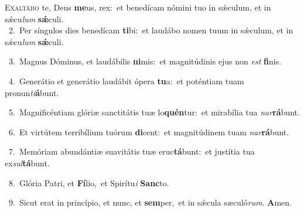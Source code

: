 \lettrine{\initial\textcolor{\initialcolor}{E}}{xaltábo} te, Deus \textbf{me}\-us, rex:~\star et benedícam nómini tuo in sǽculum, et in sǽcu\textit{lum} \textbf{sǽ}\-culi.\\
{\numbfont\textcolor{\numbcolor}{~2.}}~Per síngulos dies benedícam \textbf{ti}\-bi:~\star et laudábo nomen tuum in sǽculum, et in sǽcu\textit{lum} \textbf{sǽ}\-culi.\par
{\numbfont\textcolor{\numbcolor}{~3.}}~Magnus Dóminus, et laudábilis \textbf{ni}\-mis:~\star et magnitúdinis ejus non \textit{est} \textbf{fi}\-nis.\par
{\numbfont\textcolor{\numbcolor}{~4.}}~Generátio et generátio laudábit ópera \textbf{tu}\-a:~\star et poténtiam tuam pronun\-\textit{ti}\-\textbf{á}bunt.\par
{\numbfont\textcolor{\numbcolor}{~5.}}~Magnificéntiam glóriæ sanctitátis tuæ lo\-\textbf{quén}\-tur:~\star et mirabília tua \textit{nar}\-\textbf{rá}bunt.\par
{\numbfont\textcolor{\numbcolor}{~6.}}~Et virtútem terribílium tuórum \textbf{di}\-cent:~\star et magnitúdinem tuam \textit{nar}\-\textbf{rá}bunt.\par
{\numbfont\textcolor{\numbcolor}{~7.}}~Memóriam abundántiæ suavitátis tuæ eruc\-\textbf{tá}\-bunt:~\star et justítia tua ex\-\textit{sul}\-\textbf{tá}bunt.\par
{\numbfont\textcolor{\numbcolor}{~8.}}~Glória Patri, et \textbf{Fí}\-lio,~\star et Spirítu\textit{i} \textbf{Sanc}\-to.\par
{\numbfont\textcolor{\numbcolor}{~9.}}~Sicut erat in princípio, et nunc, et \textbf{sem}\-per,~\star et in sǽcula sæculó\-\textit{rum}\-. \textbf{A}\-men.\par
